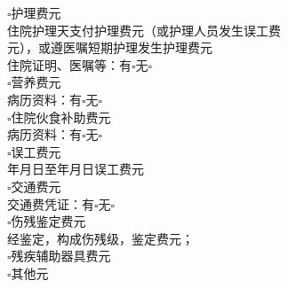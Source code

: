 \documentclass[a4paper,12pt,twoside]{ctexart}
\begin{document}
{$\square$护理费\hspace{3em}元\\
\hspace*{21bp}住院护理\hspace{2em}天支付护理费\hspace{4em}元（或护理人员发生误工费\\
\hspace*{21bp}元），或遵医嘱短期护理发生护理费\hspace{4em}元\\
\hspace*{21bp}住院证明、医嘱等：有$\square$\hspace{1em}无$\square$\\
$\square$营养费\hspace{3em}元\\
\hspace*{21bp}病历资料：有$\square$\hspace{1em}无$\square$\\
$\square$住院伙食补助费\hspace{3em}元\\
\hspace*{21bp}病历资料：有$\square$\hspace{1em}无$\square$\\
$\square$误工费\hspace{3em}元\\
\hspace*{21bp}\hspace{2em}年\hspace{1em}月\hspace{1em}日至\hspace{2em}年\hspace{1em}月\hspace{1em}日误工费\hspace{4em}元\\
$\square$交通费\hspace{3em}元\\
\hspace*{21bp}交通费凭证：有$\square$\hspace{1em}无$\square$\\
$\square$伤残鉴定费\hspace{3em}元\\
\hspace*{21bp}经鉴定，构成伤残\hspace{2em}级，鉴定费\hspace{4em}元；\\
$\square$残疾辅助器具费\hspace{3em}元\\
$\square$其他\hspace{3em}元
}
\end{document}
